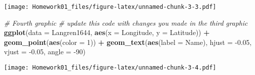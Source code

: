 \documentclass[]{article}
\newenvironment{Shaded}{\begin{snugshade}}{\end{snugshade}}
\newcommand{\CommentTok}[1]{\textcolor[rgb]{0.56,0.35,0.01}{\textit{#1}}}
\newcommand{\DataTypeTok}[1]{\textcolor[rgb]{0.13,0.29,0.53}{#1}}
\newcommand{\DecValTok}[1]{\textcolor[rgb]{0.00,0.00,0.81}{#1}}
\newcommand{\FloatTok}[1]{\textcolor[rgb]{0.00,0.00,0.81}{#1}}
\newcommand{\KeywordTok}[1]{\textcolor[rgb]{0.13,0.29,0.53}{\textbf{#1}}}
\newcommand{\NormalTok}[1]{#1}
\newcommand{\OperatorTok}[1]{\textcolor[rgb]{0.81,0.36,0.00}{\textbf{#1}}}
\newcommand{\StringTok}[1]{\textcolor[rgb]{0.31,0.60,0.02}{#1}}
\begin{document}
\texttt{[image: Homework01\_files/figure-latex/unnamed-chunk-3-3.pdf]}

\begin{Shaded}
\begin{Highlighting}[]
\CommentTok{# Fourth graphic}
\CommentTok{# update this code with changes you made in the third graphic}
\KeywordTok{ggplot}\NormalTok{(}\DataTypeTok{data =}\NormalTok{ Langren1644, }\KeywordTok{aes}\NormalTok{(}\DataTypeTok{x =}\NormalTok{ Longitude, }\DataTypeTok{y =}\NormalTok{ Latitude)) }\OperatorTok{+}\StringTok{ }
\StringTok{  }\KeywordTok{geom_point}\NormalTok{(}\KeywordTok{aes}\NormalTok{(}\DataTypeTok{color =} \DecValTok{1}\NormalTok{)) }\OperatorTok{+}\StringTok{ }
\StringTok{  }\KeywordTok{geom_text}\NormalTok{(}\KeywordTok{aes}\NormalTok{(}\DataTypeTok{label =}\NormalTok{ Name), }\DataTypeTok{hjust =} \FloatTok{-0.05}\NormalTok{, }
    \DataTypeTok{vjust =} \FloatTok{-0.05}\NormalTok{, }\DataTypeTok{angle =} \DecValTok{-90}\NormalTok{)}
\end{Highlighting}
\end{Shaded}

\texttt{[image: Homework01\_files/figure-latex/unnamed-chunk-3-4.pdf]}
\end{document}
